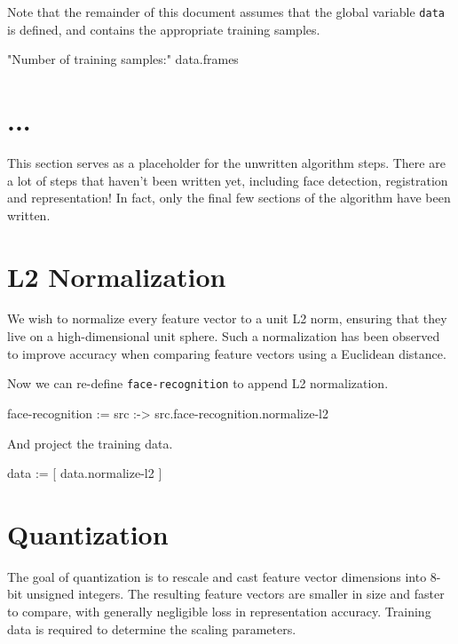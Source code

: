 \documentclass{article}
\begin{document}
Note that the remainder of this document assumes that the global variable 
\texttt{data} is defined, and contains the appropriate training samples.

\begin{likely}
"Number of training samples:"
data.frames
\end{likely}

\section{...}
This section serves as a placeholder for the unwritten algorithm steps.
There are a lot of steps that haven't been written yet, including face detection, registration and representation!
In fact, only the final few sections of the algorithm have been written.

\section{L2 Normalization}
We wish to normalize every feature vector to a unit L2 norm, ensuring that they live on a high-dimensional unit sphere.
Such a normalization has been observed to improve accuracy when comparing feature vectors using a Euclidean distance.


Now we can re-define \texttt{face-recognition} to append L2 normalization.

\begin{likely}
face-recognition :=
  src :->
    src.face-recognition.normalize-l2
\end{likely}

And project the training data.

\begin{likely}
data := [ data.normalize-l2 ]
\end{likely}

\section{Quantization}
The goal of quantization is to rescale and cast feature vector dimensions into 8-bit unsigned integers.
The resulting feature vectors are smaller in size and faster to compare, with generally negligible loss in representation accuracy.
Training data is required to determine the scaling parameters.
\end{document}
